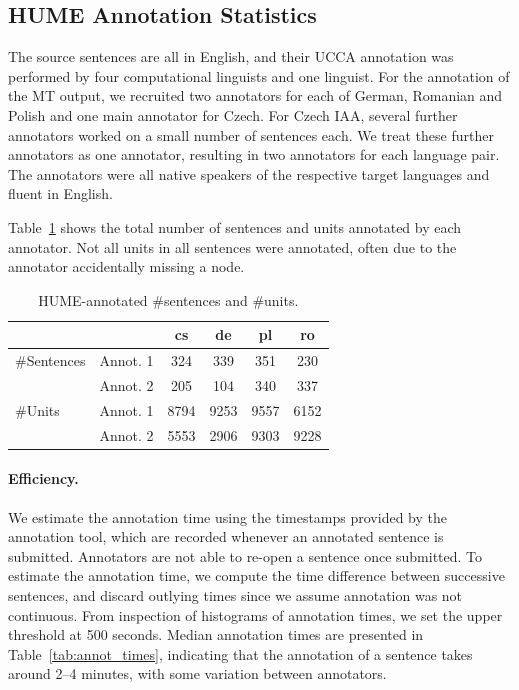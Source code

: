 \documentclass[11pt,letterpaper]{article}
\newcommand{\tabref}[1]{Table~\ref{#1}}
\newcommand{\oa}[1]{}
\begin{document}
\subsection{HUME Annotation Statistics}
\label{sec:annot_stats}

The source sentences are all in English, and their UCCA annotation was performed by four
computational linguists and one linguist.
For the annotation of the MT output, we recruited two annotators for each of German, Romanian
and Polish and one main annotator for Czech. For Czech IAA,
several further annotators worked on a small number of 
sentences each. We treat these further annotators as one annotator, resulting in two annotators
for each language pair.
The annotators were all native speakers of the respective target languages and fluent in English.
\oa{maybe we should put in what training they've received}

\tabref{tab:annot}
shows the total number of sentences and units annotated by each annotator.
Not all units in all sentences were annotated, often due to
the annotator %
accidentally missing a node.
\begin{table}
\begin{center}
{\small
\begin{tabular}{ll|cccc}
& & cs & de & pl & ro \\
\hline
\#Sentences &  Annot. 1 & 324   & 339  & 351  & 230  \\
 & Annot. 2 & 205 & 104  & 340  & 337 \\
\hline
\#Units & Annot. 1 & 8794  & 9253 & 9557  & 6152 \\
 &Annot. 2 & 5553 & 2906  & 9303  & 9228  \\
\end{tabular}
\caption{HUME-annotated \#sentences and \#units.}
\label{tab:annot}
}
\end{center}
\end{table}

\paragraph{Efficiency.}
We estimate the annotation time using the timestamps
provided by the annotation tool, which are recorded whenever an annotated sentence is
submitted. Annotators are not able to re-open a sentence once submitted. 
To estimate the annotation time, we compute the time difference between successive 
sentences, and discard outlying times since we assume annotation was not continuous.
From inspection of histograms of annotation times, we set the upper threshold at 500 seconds.
Median annotation times are presented in Table~\ref{tab:annot_times},
indicating that the annotation
of a sentence takes around 2--4 minutes, with some variation between annotators.
\end{document}
